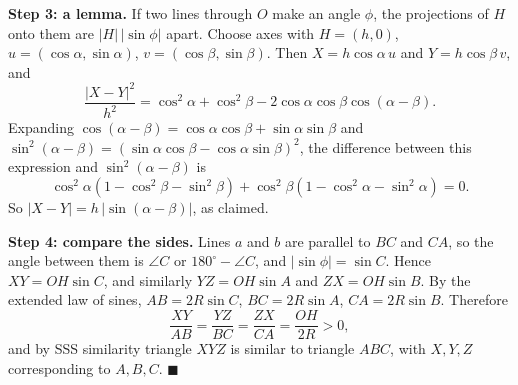 \textbf{Step 3: a lemma.} If two lines through $O$ make an angle $\phi$, the projections of $H$ onto them are $|H|\,|\sin\phi|$ apart. Choose axes with $H=(h,0)$, $u=(\cos\alpha,\sin\alpha)$, $v=(\cos\beta,\sin\beta)$. Then $X=h\cos\alpha\,u$ and $Y=h\cos\beta\,v$, and
\[\dfrac{|X-Y|^2}{h^2}=\cos^2\alpha+\cos^2\beta-2\cos\alpha\cos\beta\cos(\alpha-\beta).\]
Expanding $\cos(\alpha-\beta)=\cos\alpha\cos\beta+\sin\alpha\sin\beta$ and $\sin^2(\alpha-\beta)=(\sin\alpha\cos\beta-\cos\alpha\sin\beta)^2$, the difference between this expression and $\sin^2(\alpha-\beta)$ is
\[\cos^2\alpha\left(1-\cos^2\beta-\sin^2\beta\right)+\cos^2\beta\left(1-\cos^2\alpha-\sin^2\alpha\right)=0.\]
So $|X-Y|=h\,|\sin(\alpha-\beta)|$, as claimed.

\textbf{Step 4: compare the sides.} Lines $a$ and $b$ are parallel to $BC$ and $CA$, so the angle between them is $\angle C$ or $180^\circ-\angle C$, and $|\sin\phi|=\sin C$. Hence $XY=OH\sin C$, and similarly $YZ=OH\sin A$ and $ZX=OH\sin B$. By the extended law of sines, $AB=2R\sin C$, $BC=2R\sin A$, $CA=2R\sin B$. Therefore
\[\dfrac{XY}{AB}=\dfrac{YZ}{BC}=\dfrac{ZX}{CA}=\dfrac{OH}{2R}>0,\]
and by SSS similarity triangle $XYZ$ is similar to triangle $ABC$, with $X,Y,Z$ corresponding to $A,B,C$. $\blacksquare$
